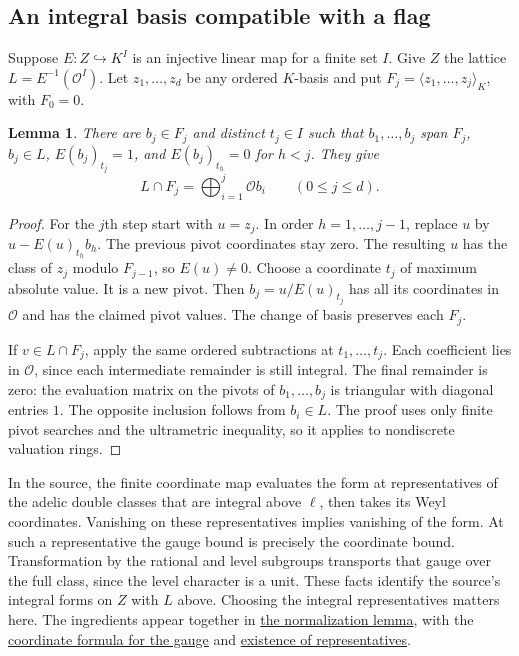 \documentclass[11pt,letterpaper]{article}
\newtheorem{lemma}[theorem]{Lemma}
\newcommand{\cO}{\mathcal O}
\newcommand{\src}[3]{\href{https://github.com/VladimirReshetnikov/ProveIt/blob/89d12dd40424f1217fd818d84877b3da52396a3b/Analysis/GeneralizedRiemannHypothesis/Lean/grh/src/#1.lean\#L#2}{#3}}
\newcommand{\lv}[2]{\src{New/OneLift/LiftVolumeHeight}{#1}{#2}}
\begin{document}
\subsection{An integral basis compatible with a flag}
Suppose $E:Z\hookrightarrow K^I$ is an injective linear map for a finite set $I$. Give $Z$ the lattice $L=E^{-1}(\cO^I)$. Let $z_1,\dots,z_d$ be any ordered $K$-basis and put $F_j=\langle z_1,\ldots,z_j\rangle_K$, with $F_0=0$.
\begin{lemma}\label{lem:pivot}
There are $b_j\in F_j$ and distinct $t_j\in I$ such that $b_1,\ldots,b_j$ span $F_j$, $b_j\in L$, $E(b_j)_{t_j}=1$, and $E(b_j)_{t_h}=0$ for $h<j$. They give
\[
             L\cap F_j=\bigoplus_{i=1}^j\cO b_i\qquad(0\le j\le d).
\]
\end{lemma}
\begin{proof}
For the $j$th step start with $u=z_j$. In order $h=1,\ldots,j-1$, replace $u$ by $u-E(u)_{t_h}b_h$. The previous pivot coordinates stay zero. The resulting $u$ has the class of $z_j$ modulo $F_{j-1}$, so $E(u)\ne0$. Choose a coordinate $t_j$ of maximum absolute value. It is a new pivot. Then $b_j=u/E(u)_{t_j}$ has all its coordinates in $\cO$ and has the claimed pivot values. The change of basis preserves each $F_j$.

If $v\in L\cap F_j$, apply the same ordered subtractions at $t_1,\ldots,t_j$. Each coefficient lies in $\cO$, since each intermediate remainder is still integral. The final remainder is zero: the evaluation matrix on the pivots of $b_1,\ldots,b_j$ is triangular with diagonal entries $1$. The opposite inclusion follows from $b_i\in L$. The proof uses only finite pivot searches and the ultrametric inequality, so it applies to nondiscrete valuation rings.
\end{proof}
\noindent
In the source, the finite coordinate map evaluates the form at representatives of the adelic double classes that are integral above $\ell$, then takes its Weyl coordinates. Vanishing on these representatives implies vanishing of the form. At such a representative the gauge bound is precisely the coordinate bound. Transformation by the rational and level subgroups transports that gauge over the full class, since the level character is a unit. These facts identify the source's integral forms on $Z$ with $L$ above. Choosing the integral representatives matters here. The ingredients appear together in \lv{124}{the normalization lemma}, with the \src{Lib/Adelic/AutomorphicForms/PAdicGauge}{150}{coordinate formula for the gauge} and \src{Lib/Adelic/AutomorphicForms/PAdicGauge}{232}{existence of representatives}.
\end{document}
